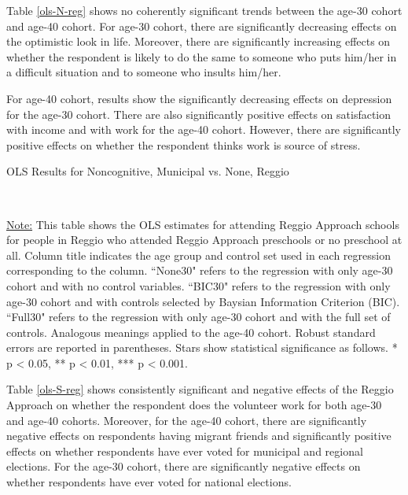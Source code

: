 Table \ref{ols-N-reg} shows no coherently significant trends between the age-30 cohort and age-40 cohort. For age-30 cohort, there are significantly decreasing effects on the optimistic look in life. Moreover, there are significantly increasing effects on whether the respondent is likely to do the same to someone who puts him/her in a difficult situation and to someone who insults him/her.

For age-40 cohort, results show the significantly decreasing effects on depression for the age-30 cohort. There are also significantly positive effects on satisfaction with income and with work for the age-40 cohort. However, there are significantly positive effects on whether the respondent thinks work is source of stress. 

\begin{table}[H] \caption{OLS Results for Noncognitive, Municipal vs. None, Reggio} \label{ols-N-reg}

\vspace{1ex} \\
\footnotesize\raggedright{\underline{Note:} This table shows the OLS estimates for attending Reggio Approach schools for people in Reggio who attended Reggio Approach preschools or no preschool at all. Column title indicates the age group and control set used in each regression corresponding to the column. ``None30" refers to the regression with only age-30 cohort and with no control variables. ``BIC30" refers to the regression with only age-30 cohort and with controls selected by Baysian Information Criterion (BIC). ``Full30" refers to the regression with only age-30 cohort and with the full set of controls. Analogous meanings applied to the age-40 cohort. Robust standard errors are reported in parentheses. Stars show statistical significance as follows. * p < 0.05, ** p < 0.01, *** p < 0.001.}
\end{table}

Table \ref{ols-S-reg} shows consistently significant and negative effects of the Reggio Approach on whether the respondent does the volunteer work for both age-30 and age-40 cohorts. Moreover, for the age-40 cohort, there are significantly negative effects on respondents having migrant friends and significantly positive effects on whether respondents have ever voted for municipal and regional elections. For the age-30 cohort, there are significantly negative effects on whether respondents have ever voted for national elections.

